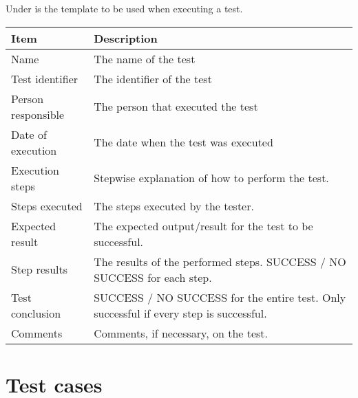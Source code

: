 \documentclass[12pt, fullpage, oneside]{report}
\begin{document}
		\vspace{8 mm}
		Under is the template to be used when executing a test.
		\vspace{8 mm}

		\begin{center}
			\begin{tabular}{ |  p{3.5cm} | p{10cm} | }
				\hline
				Item & Description \\ [5pt] \hline \hline
				Name & The name of the test \\  [5pt] \hline
				Test identifier & The identifier of the test \\  [5pt] \hline
				Person responsible & The person that executed the test \\  [5pt] \hline
				Date of execution & The date when the test was executed \\ [5pt] \hline
				Execution steps & Stepwise explanation of how to perform the test. \\  [5pt] \hline
				Steps executed & The steps executed by the tester. \\ [5pt] \hline
				Expected result & The expected output/result for the test to be successful. \\  [5pt] \hline
				Step results & The results of the performed steps. SUCCESS / NO SUCCESS for each step. \\ [5pt] \hline
				Test conclusion & SUCCESS / NO SUCCESS for the entire test. Only successful if every step is successful. \\ [5pt] \hline
				Comments & Comments, if necessary, on the test. \\ [5pt] \hline
			\end{tabular}
		\end{center}

	\newpage
	\section{Test cases}
		\vspace{8 mm}		
\end{document}
